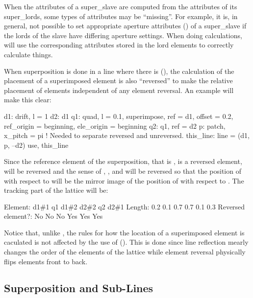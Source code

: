When the attributes of a super_slave are computed from the attributes of its super_lords, some types
of attributes may be ``missing''. For example, it is, in general, not possible to set appropriate
aperture attributes () of a super_slave if the lords of the slave have differing
aperture settings. When doing calculations, \bmad will use the corresponding attributes stored in
the lord elements to correctly calculate things.

When superposition is done in a line where there is  (),
the calculation of the placement of a superimposed element is also ``reversed'' to make the relative
placement of elements independent of any element reversal.  An example will make this clear:
\begin{example}
  d1: drift, l = 1
  d2: d1
  q1: quad, l = 0.1, superimpose, ref = d1, offset = 0.2, 
             ref_origin = beginning, ele_origin = beginning
  q2: q1, ref = d2
  p: patch, x_pitch = pi  ! Needed to separate reversed and unreversed.
  this_line: line = (d1, p, --d2)
  use, this_line
\end{example}
Since the reference element of the  superposition, that is , is a reversed element,
 will be reversed and the sense of , , and  will be
reversed so that the position of  with respect to  will be the mirror image of the
position of  with respect to . The tracking part of the lattice will be:
\begin{example}
  Element:           d1{\#}1    q1  d1{\#}2   d2{\#}2    q2   d2{\#}1
  Length:             0.2   0.1   0.7    0.7   0.1    0.3
  Reversed element?:   No    No    No    Yes   Yes    Yes
\end{example}

Notice that, unlike , the rules for how the location of a superimposed element
is caculated is not affected by the use of  (). This is
done since line reflection mearly changes the order of the elements of the lattice while element
reversal physically flips elements front to back.

\subsection{Superposition and Sub-Lines}
\label{s:super.sub.line}

